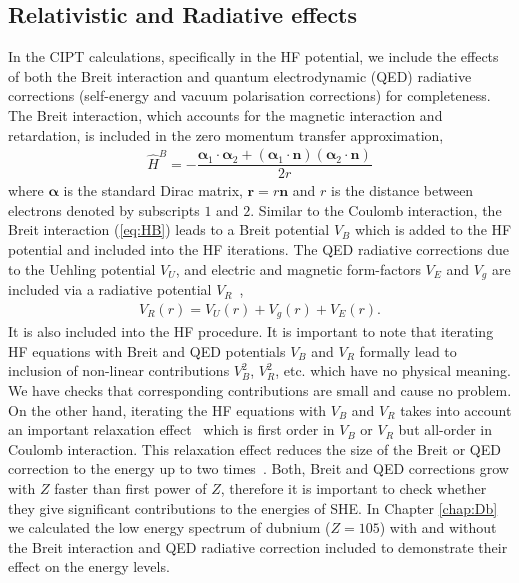 \documentclass[10pt,a4paper, twoside, openright]{report}
\begin{document}
\subsection{Relativistic and Radiative effects}
In the CIPT calculations, specifically in the HF potential, we include the effects of both the Breit interaction \cite{Breit1929, Mann1971} and quantum electrodynamic (QED) radiative corrections (self-energy and vacuum polarisation corrections) \cite{FG2005} for completeness. The Breit interaction, which accounts for the magnetic interaction and retardation, is included in the zero momentum transfer approximation,
\begin{align}\label{eq:HB}
\hat{H}^B = -\dfrac{\boldsymbol{\alpha}_1 \cdot \boldsymbol{\alpha}_2 + \left(\boldsymbol{\alpha}_1\cdot\textbf{n}\right)\left(\boldsymbol{\alpha}_2\cdot \textbf{n}\right)}{2r}
\end{align}
where $\boldsymbol{\alpha}$ is the standard Dirac matrix, $\textbf{r}=r\textbf{n}$ and $r$ is the distance between electrons denoted by subscripts $1$ and $2$.  Similar to the Coulomb interaction, the Breit interaction (\ref{eq:HB}) leads to a Breit potential $V_B$ which is added to the HF potential and included into the HF iterations. The QED radiative corrections due to the Uehling potential $V_U$, and electric and magnetic form-factors $V_E $ and $ V_g$  are included via a radiative potential $V_R$~\cite{FG2005},
\begin{align}\label{eq:VR}
V_{R}(r) = V_{U}(r) + V_{g}(r) + V_{E}(r).
\end{align}
It is also included into the HF procedure. It is important to note that iterating HF equations with Breit and QED potentials $V_B$ and $V_R$ formally lead to inclusion of non-linear contributions  $V_B^2$, $V_R^2$, etc. which have no physical meaning. We have checks that corresponding contributions are small and cause no problem. On the other hand, iterating the HF equations with $V_B$ and $V_R$ takes into account an important relaxation effect~\cite{DF2016} which is first order in $V_B$ or $V_R$ but all-order in Coulomb interaction. This relaxation effect reduces the size of the Breit or QED correction to the energy up to two times~\cite{DF2016}. Both, Breit and QED corrections grow with $Z$ faster than first power of $Z$, therefore it is important to check whether they give significant contributions to the energies of SHE.  In Chapter \ref{chap:Db} we calculated the low energy spectrum of dubnium ($Z=105$) with and without the Breit interaction and QED radiative correction included to demonstrate their effect on the energy levels. 
\end{document}
